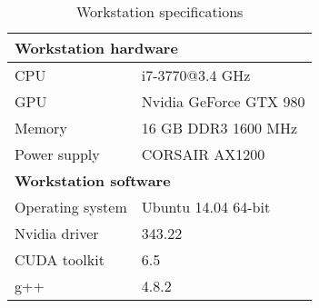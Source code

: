 \begin{table}[h]
	\begin{center}
	\begin{tabular}{|l|l|}
		\hline
		\multicolumn{2}{|l|}{\textbf{Workstation hardware}} \\ \hline
		CPU & i7-3770@3.4 GHz \\ \hline
		GPU & Nvidia GeForce GTX 980 \\ \hline
		Memory & 16 GB DDR3 1600 MHz \\ \hline
		Power supply & CORSAIR AX1200 \\ \hline
		\multicolumn{2}{|l|}{\textbf{Workstation software}} \\ \hline
		Operating system & Ubuntu 14.04 64-bit \\ \hline
		Nvidia driver & 343.22 \\ \hline
		CUDA toolkit & 6.5 \\ \hline
		g++ & 4.8.2 \\ \hline
	\end{tabular}
	\end{center}
	\caption{Workstation specifications}
	\label{table:workstation}
\end{table}
